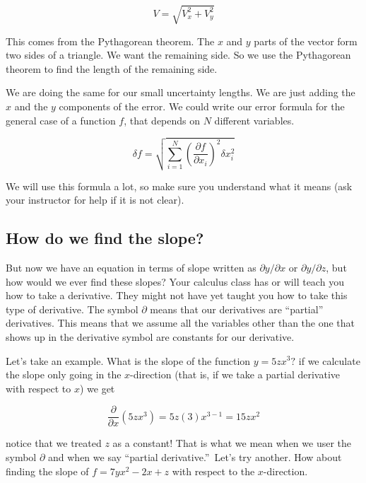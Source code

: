 \begin{equation*}
	V=\sqrt{V_{x}^{2}+V_{y}^{2}}
\end{equation*}

This comes from the Pythagorean theorem. The $x$ and $y$ parts of the vector form two sides of a triangle. We want the remaining side. So we use the Pythagorean theorem to find the length of the remaining side.

We are doing the same for our small uncertainty lengths. We are just adding the $x$ and the $y$ components of the error. We could write our error formula for the general case of a function $f$, that depends on $N$ different variables. 

\begin{equation*}
	\delta f=\sqrt{\sum_{i=1}^{N}\left( \frac{\partial f}{\partial x_{i}}\right)^{2}\delta x_{i}^{2}}
\end{equation*}

We will use this formula a lot, so make sure you understand what it means (ask your instructor for help if it is not clear).

\subsection{How do we find the slope?}

But now we have an equation in terms of slope written as $\partial y/\partial x$ or $\partial y/\partial z$, but how would we ever find these slopes? Your calculus class has or will teach you how to take a derivative. They might not have yet taught you how to take this type of derivative. The symbol $\partial $ means that our derivatives are ``partial'' derivatives. This means that we assume all the variables other than the one that shows up in the derivative symbol are constants for our derivative.

Let's take an example. What is the slope of the function $y=5zx^{3}?$ if we calculate the slope only going in the $x$-direction (that is, if we take a partial derivative with respect to $x$) we get

\begin{equation*}
   \frac{\partial }{\partial x}\left( 5zx^{3}\right) =5z\left( 3\right) x^{3-1}=15zx^{2}
\end{equation*}

notice that we treated $z$ as a constant! That is what we mean when we user the symbol $\partial $ and when we say \textquotedblleft partial derivative.\textquotedblright\ Let's try another. How about finding the slope of $f=7yx^{2}-2x+z$ with respect to the $x$-direction.


